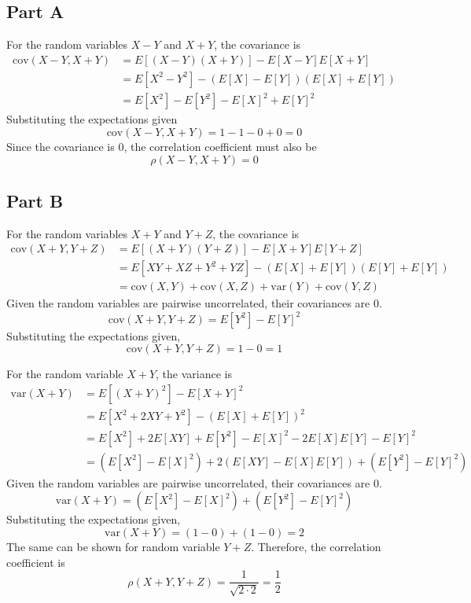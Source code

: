 \documentclass{article}
\begin{document}
\subsection*{Part A}

For the random variables $X - Y$ and $X + Y$, the covariance is
\begin{align*}
  \mathrm{cov}(X - Y, X + Y) &= E[(X - Y)(X + Y)] - E[X - Y] E[X + Y] \\
  &= E[X^2 - Y^2] - (E[X] - E[Y])(E[X] + E[Y]) \\
  &= E[X^2] - E[Y^2] - E[X]^2 + E[Y]^2
\end{align*}
Substituting the expectations given
$$ \mathrm{cov}(X - Y, X + Y) = 1 - 1 - 0 + 0 = 0 $$
Since the covariance is $0$, the correlation coefficient must also be
$$ \rho(X - Y, X + Y) = 0 $$

\subsection*{Part B}

For the random variables $X + Y$ and $Y + Z$, the covariance is
\begin{align*}
  \mathrm{cov}(X + Y, Y + Z) &= E[(X + Y)(Y + Z)] - E[X + Y]E[Y + Z] \\
  &= E[XY + XZ + Y^2 + YZ] - (E[X] + E[Y])(E[Y] + E[Y]) \\
  &= \mathrm{cov}(X, Y) + \mathrm{cov}(X, Z) + \mathrm{var}(Y) + \mathrm{cov}(Y, Z)
\end{align*}
Given the random variables are pairwise uncorrelated, their covariances are
$0$.
$$ \mathrm{cov}(X + Y, Y + Z) = E[Y^2] - E[Y]^2 $$
Substituting the expectations given,
$$ \mathrm{cov}(X + Y, Y + Z) = 1 - 0 = 1 $$

For the random variable $X + Y$, the variance is
\begin{align*}
  \mathrm{var}(X + Y) &= E[(X + Y)^2] - E[X + Y]^2 \\
  &= E[X^2 + 2XY + Y^2] - (E[X] + E[Y])^2 \\
  &= E[X^2] + 2E[XY] + E[Y^2] - E[X]^2 - 2E[X]E[Y] - E[Y]^2 \\
  &= (E[X^2] - E[X]^2) + 2(E[XY] - E[X]E[Y]) + (E[Y^2] - E[Y]^2)
\end{align*}
Given the random variables are pairwise uncorrelated, their covariances are
$0$.
$$ \mathrm{var}(X + Y) = (E[X^2] - E[X]^2) + (E[Y^2] - E[Y]^2) $$
Substituting the expectations given,
$$ \mathrm{var}(X + Y) = (1 - 0) + (1 - 0) = 2 $$
The same can be shown for random variable $Y + Z$. Therefore, the correlation
coefficient is
$$ \rho(X + Y, Y + Z) = \frac{1}{\sqrt{2 \cdot 2}} = \frac{1}{2} $$
\end{document}

